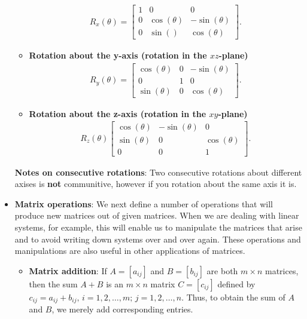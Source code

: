 \documentclass{report}
\begin{document}
\begin{itemize}
\begin{itemize}
\begin{align*}
                        R_{x}(\theta ) =  \begin{bmatrix} 1 & 0 & 0 \\ 0 & \cos{\left(\theta \right)} & -\sin{\left(\theta \right)} \\ 0 & \sin{\left(\right)} & \cos{\left(\theta \right)}\end{bmatrix}
                    .\end{align*}
                \item \textbf{Rotation about the y-axis (rotation in the $xz$-plane)}
                    \begin{align*}
                        R_{y}(\theta ) = \begin{bmatrix} \cos{\left(\theta   \right)} & 0 & -\sin{\left(\theta \right)} \\ 0 & 1 & 0 \\ \sin{\left(\theta \right)} & 0 & \cos{\left(\theta \right)}\end{bmatrix}
                    .\end{align*}
                \item \textbf{Rotation about the z-axis (rotation in the $xy$-plane)}
                    \begin{align*}
                        R_{z}(\theta ) \begin{bmatrix} \cos{\left(\theta \right)} & -\sin{\left(\theta \right)} & 0 \\ \sin{\left(\theta \right)} & 0 & \cos{\left(\theta \right)} \\ 0 & 0 & 1\end{bmatrix}
                    .\end{align*}
            \end{itemize}
            \bigbreak \noindent 
            \textbf{Notes on consecutive rotations}: Two consecutive rotations about different axises is \textbf{not} communitive, however if you rotation about the same axis it is.
        \item \textbf{Matrix operations}: We next define a number of operations that will produce new matrices out of given matrices. When we are dealing with linear systems, for example, this will enable us to manipulate the matrices that arise and to avoid writing down systems over and over again. These operations and manipulations are also useful in other applications of matrices.
            \begin{itemize}
                \item \textbf{Matrix addition}: If \( A = [a_{ij}] \) and \( B = [b_{ij}] \) are both \( m \times n \) matrices, then the sum \( A + B \) is an \( m \times n \) matrix \( C = [c_{ij}] \) defined by \( c_{ij} = a_{ij} + b_{ij}, \, i = 1, 2, \ldots, m; \, j = 1, 2, \ldots, n \). Thus, to obtain the sum of \( A \) and \( B \), we merely add corresponding entries.

\end{itemize}
\end{itemize}
\end{document}
